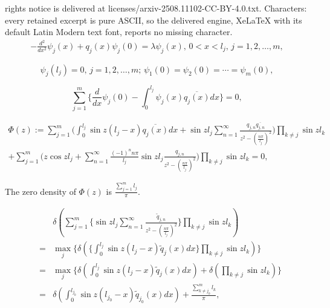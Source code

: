 \documentclass[10pt,a4paper]{amsart}
\begin{document}
rights notice is delivered at licenses/arxiv-2508.11102-CC-BY-4.0.txt. Characters: every retained excerpt is pure ASCII, so the delivered engine, XeLaTeX with its default Latin Modern text font, reports no missing character.
\begin{eqnarray}\label{1.1}
-\frac{d^{2}}{dx^{2}}\psi_{j}(x)+q_{j}(x)\psi_{j}(0)=\lambda\psi_{j}(x),\,0<x<l_{j},\,j=1,2,\ldots,m,
\end{eqnarray}

\begin{equation}\label{1.2}
\psi_{j}(l_{j})=0,\,j=1,2,\ldots,m;\,\psi_{1}(0)=\psi_{2}(0)=\cdots=\psi_{m}(0),
\end{equation}

\begin{equation}\label{1.3}
\sum_{j=1}^{m}\big\{\frac{d}{dx}\psi_{j}(0)-\int_{0}^{l_{j}}\psi_{j}(x)\overline{q_{j}(x)}dx\big\}=0,
\end{equation}

\begin{eqnarray}\nonumber
\Phi(z):=\sum_{j=1}^{m}\Big(\int_{0}^{l_{j}}\sin{z(l_{j}-x)}\overline{q_{j}(x)}dx+\sin{z l_{j}}\sum_{n=1}^{\infty}\frac{q_{j,n}\overline{q_{j,n}}}{z^{2}-(\frac{n\pi}{l_{j}})^{2}}\Big)\prod_{k\neq j}\sin{z l_{k}}\\
+\sum_{j=1}^{m}\Big(z\cos{z l_{j}}+\sum_{n=1}^{\infty}\frac{(-1)^{n}n\pi}{l_{j}}\sin{z l_{j}}\frac{q_{j,n}}{z^{2}-(\frac{n\pi}{l_{j}})^{2}}\Big)\prod_{k\neq j}\sin{z l_{k}}=0,\label{Phi}
\end{eqnarray}

\begin{theorem}\label{T31}
The zero density of $\Phi(z)$ is $\frac{\sum_{j=1}^{m}l_{j}}{\pi}$.
\end{theorem}

\begin{eqnarray}\nonumber
&&\delta(\sum_{j=1}^{m}\Big\{\sin{z l_{j}}\sum_{n=1}^{\infty}\frac{\widetilde{q}_{j,n}}{z^{2}-(\frac{n\pi}{l_{j}})^{2}}\Big\}\prod_{k\neq j}\sin{z l_{k}})\\\nonumber
&=&\max_{j}\{\delta(\Big\{\int_{0}^{l_{j}}\sin{z(l_{j}-x)}\widetilde{q}_{j}(x)dx\Big\}\prod_{k\neq j}\sin{z l_{k}})\}\\&=&\max_{j}\{\delta(\int_{0}^{l_{j}}\sin{z(l_{j}-x)}\widetilde{q}_{j}(x)dx)+\delta(\prod_{k\neq j}\sin{z l_{k}})\}\\
&=&\delta(\int_{0}^{l_{j_{0}}}\sin{z(l_{j_{0}}-x)}\widetilde{q}_{j_{0}}(x)dx)+\frac{\sum_{k\neq j_{0}}^{m}l_{k}}{\pi}\label{3.4},
\end{eqnarray}
\end{document}
